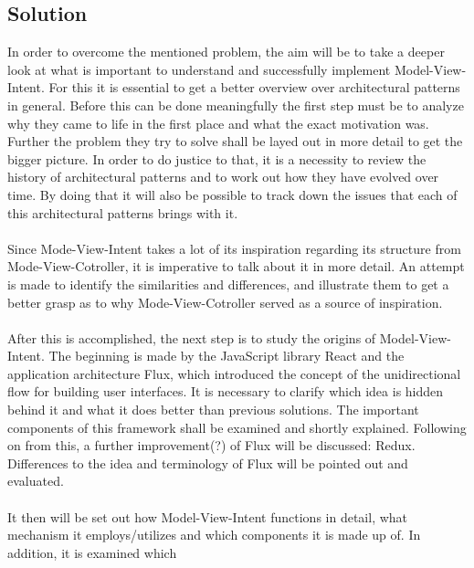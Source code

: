 \subsection{Solution}
\label{subsec:solution}


In order to overcome the mentioned problem, the aim will be to take a deeper look at what is important to understand and successfully implement Model-View-Intent.
For this it is essential to get a better overview over architectural patterns in general. Before this can be done meaningfully the first step must be 
to analyze why they came to life in the first place and what the exact motivation was. Further the problem they try to solve shall be layed out in more detail to 
get the bigger picture. In order to do justice to that, it is a necessity to review the history of architectural patterns and to work out how they have evolved over time.
By doing that it will also be possible to track down the issues that each of this architectural patterns brings with it.
\\
\\
Since Mode-View-Intent takes a lot of its inspiration regarding its structure from Mode-View-Cotroller, it is imperative to talk about it in more detail.
An attempt is made to identify the similarities and differences, and illustrate them to get a better grasp as to why Mode-View-Cotroller served as a source of inspiration.
\\
\\
After this is accomplished, the next step is to study the origins of Model-View-Intent. The beginning is made by the JavaScript library React and the application architecture
Flux, which introduced the concept of the unidirectional flow for building user interfaces. It is necessary to clarify which idea is hidden behind it and what it does
better than previous solutions. The important components of this framework shall be examined and shortly explained. Following on from this, a further improvement(?) of Flux will 
be discussed: Redux. Differences to the idea and terminology of Flux will be pointed out and evaluated.
\\
\\
It then will be set out how Model-View-Intent functions in detail, what mechanism it employs/utilizes and which components it is made up of. In addition, it is examined which 
